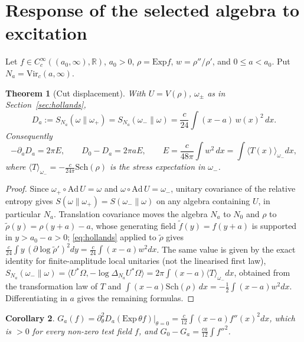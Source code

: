 \documentclass[12pt]{article}
\newtheorem{theorem}{Theorem}[section]
\newtheorem{corollary}[theorem]{Corollary}
\theoremstyle{definition}
\theoremstyle{remark}
\begin{document}
\section{Response of the selected algebra to excitation}\label{sec:response}

Let \(f\in C_c^\infty((a_0,\infty),\mathbb R)\), \(a_0>0\), \(\rho=\mathrm{Exp}f\),
\(w=\rho''/\rho'\), and \(0\le a<a_0\). Put \(N_a=\mathrm{Vir}_c(a,\infty)\).

\begin{theorem}[Cut displacement]\label{thm:displacement}
With \(U=V(\rho)\), \(\omega_\pm\) as in Section~\ref{sec:hollands},
\[
D_a:=S_{N_a}(\omega\|\omega_+)=S_{N_a}(\omega_-\|\omega)=\frac c{24}\int(x-a)\,w(x)^2\,dx .
\]
Consequently
\[
-\partial_aD_a=2\pi E,\qquad D_0-D_a=2\pi aE,\qquad
E=\frac c{48\pi}\int w^2\,dx=\int\langle T(x)\rangle_{\omega_-}dx,
\]
where \(\langle T\rangle_{\omega_-}=-\tfrac c{24\pi}\mathrm{Sch}(\rho)\) is the stress
expectation in \(\omega_-\).
\end{theorem}
\begin{proof}
Since \(\omega_+\circ\mathrm{Ad}\,U=\omega\) and \(\omega\circ\mathrm{Ad}\,U=\omega_-\),
unitary covariance of the relative entropy gives
\(S(\omega\|\omega_+)=S(\omega_-\|\omega)\) on any algebra containing \(U\), in
particular \(N_a\). Translation covariance moves the algebra \(N_a\) to \(N_0\) and
\(\rho\) to \(\tilde\rho(y)=\rho(y+a)-a\), whose generating field
\(\tilde f(y)=f(y+a)\) is supported in \(y>a_0-a>0\); \eqref{eq:hollands} applied to
\(\tilde\rho\) gives \(\frac c{24}\int y\,(\partial\log\tilde\rho')^2dy=\frac c{24}\int(x-a)w^2dx\).
The same value is given by the exact identity for finite-amplitude local unitaries (not the linearised first law),
\(S_{N_a}(\omega_-\|\omega)=\langle U^*\Omega,-\log\Delta_{N_a}U^*\Omega\rangle
=2\pi\int(x-a)\langle T\rangle_{\omega_-}dx\), obtained from the transformation law of
\(T\) and \(\int(x-a)\mathrm{Sch}(\rho)\,dx=-\tfrac12\int(x-a)w^2dx\). Differentiating in
\(a\) gives the remaining formulas.
\end{proof}

\begin{corollary}\label{cor:hessian}
\(G_a(f)=\partial^2_\theta D_a(\mathrm{Exp}\,\theta f)|_{\theta=0}=\frac c{12}\int(x-a)f''(x)^2dx\), which is \(>0\) for every non-zero test field \(f\),
and \(G_0-G_a=\tfrac{ca}{12}\int f''^2\).
\end{corollary}
\end{document}
